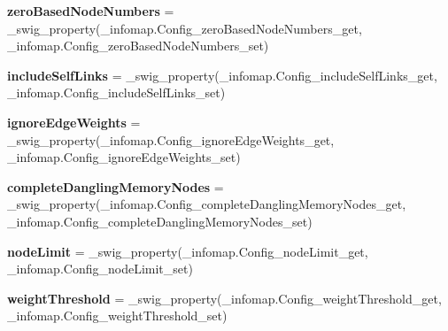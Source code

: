 \begin{DoxyCompactItemize}
\item 
\mbox{\label{classdsmacc_1_1graph_1_1infomap_1_1Config_acb1e0379f22d16c7640fa62b7872b63c}} 
{\bfseries zero\+Based\+Node\+Numbers} = \+\_\+swig\+\_\+property(\+\_\+infomap.\+Config\+\_\+zero\+Based\+Node\+Numbers\+\_\+get, \+\_\+infomap.\+Config\+\_\+zero\+Based\+Node\+Numbers\+\_\+set)
\item 
\mbox{\label{classdsmacc_1_1graph_1_1infomap_1_1Config_ab45cf5e56d407e3281d6bdf85078f684}} 
{\bfseries include\+Self\+Links} = \+\_\+swig\+\_\+property(\+\_\+infomap.\+Config\+\_\+include\+Self\+Links\+\_\+get, \+\_\+infomap.\+Config\+\_\+include\+Self\+Links\+\_\+set)
\item 
\mbox{\label{classdsmacc_1_1graph_1_1infomap_1_1Config_ac3d1201a371cffe35c58ca078461e722}} 
{\bfseries ignore\+Edge\+Weights} = \+\_\+swig\+\_\+property(\+\_\+infomap.\+Config\+\_\+ignore\+Edge\+Weights\+\_\+get, \+\_\+infomap.\+Config\+\_\+ignore\+Edge\+Weights\+\_\+set)
\item 
\mbox{\label{classdsmacc_1_1graph_1_1infomap_1_1Config_a210a642eb937bdf309494515b7d97be3}} 
{\bfseries complete\+Dangling\+Memory\+Nodes} = \+\_\+swig\+\_\+property(\+\_\+infomap.\+Config\+\_\+complete\+Dangling\+Memory\+Nodes\+\_\+get, \+\_\+infomap.\+Config\+\_\+complete\+Dangling\+Memory\+Nodes\+\_\+set)
\item 
\mbox{\label{classdsmacc_1_1graph_1_1infomap_1_1Config_a763e5c97d8fff22b9bbe600bcad082fa}} 
{\bfseries node\+Limit} = \+\_\+swig\+\_\+property(\+\_\+infomap.\+Config\+\_\+node\+Limit\+\_\+get, \+\_\+infomap.\+Config\+\_\+node\+Limit\+\_\+set)
\item 
\mbox{\label{classdsmacc_1_1graph_1_1infomap_1_1Config_a9c4534efb15ca4e4fdb3b139a5386023}} 
{\bfseries weight\+Threshold} = \+\_\+swig\+\_\+property(\+\_\+infomap.\+Config\+\_\+weight\+Threshold\+\_\+get, \+\_\+infomap.\+Config\+\_\+weight\+Threshold\+\_\+set)
\item 
\mbox{\label{classdsmacc_1_1graph_1_1infomap_1_1Config_aabea95fa0f58c0d9b9cd74ebfdc914e6}} 

\end{DoxyCompactItemize}
